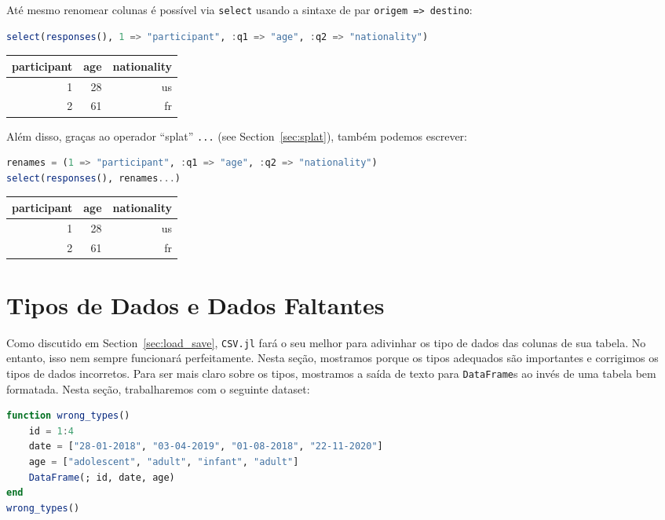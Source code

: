 \documentclass[
  notoc %
]{tufte-book}
\newcommand{\passthrough}[1]{#1}
\begin{document}
Até mesmo renomear colunas é possível via
\passthrough{\lstinline!select!} usando a sintaxe de par
\passthrough{\lstinline!origem => destino!}:

\begin{lstlisting}[language=Julia]
select(responses(), 1 => "participant", :q1 => "age", :q2 => "nationality")
\end{lstlisting}

\begin{longtable}[]{@{}rrr@{}}
\toprule
participant & age & nationality \\
\midrule
\endhead
1 & 28 & us \\
2 & 61 & fr \\
\bottomrule
\end{longtable}

Além disso, graças ao operador ``splat'' \passthrough{\lstinline!...!}
(see Section~\ref{sec:splat}), também podemos escrever:

\begin{lstlisting}[language=Julia]
renames = (1 => "participant", :q1 => "age", :q2 => "nationality")
select(responses(), renames...)
\end{lstlisting}

\begin{longtable}[]{@{}rrr@{}}
\toprule
participant & age & nationality \\
\midrule
\endhead
1 & 28 & us \\
2 & 61 & fr \\
\bottomrule
\end{longtable}

\hypertarget{sec:missing_data}{%
\section{Tipos de Dados e Dados Faltantes}\label{sec:missing_data}}

Como discutido em Section~\ref{sec:load_save},
\passthrough{\lstinline!CSV.jl!} fará o seu melhor para adivinhar os
tipo de dados das colunas de sua tabela. No entanto, isso nem sempre
funcionará perfeitamente. Nesta seção, mostramos porque os tipos
adequados são importantes e corrigimos os tipos de dados incorretos.
Para ser mais claro sobre os tipos, mostramos a saída de texto para
\passthrough{\lstinline!DataFrame!}s ao invés de uma tabela bem
formatada. Nesta seção, trabalharemos com o seguinte dataset:

\begin{lstlisting}[language=Julia]
function wrong_types()
    id = 1:4
    date = ["28-01-2018", "03-04-2019", "01-08-2018", "22-11-2020"]
    age = ["adolescent", "adult", "infant", "adult"]
    DataFrame(; id, date, age)
end
wrong_types()
\end{lstlisting}
\end{document}
